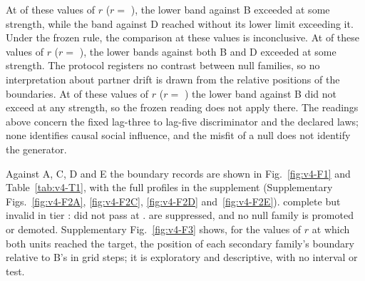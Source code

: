 At  of these values of $r$ ($r=$ ), the lower band against B exceeded  at some strength, while the band against D reached  without its lower limit exceeding it. Under the frozen rule, the comparison at these values is inconclusive. %
At  of these values of $r$ ($r=$ ), the lower bands against both B and D exceeded  at some strength. The protocol registers no contrast between null families, so no interpretation about partner drift is drawn from the relative positions of the boundaries. %
At  of these values of $r$ ($r=$ ) the lower band against B did not exceed  at any strength, so the frozen reading does not apply there. %
The readings above concern the fixed lag-three to lag-five discriminator and the declared laws; none identifies causal social influence, and the misfit of a null does not identify the generator. %

Against A, C, D and E the boundary records are shown in Fig.~\ref{fig:v4-F1} and Table~\ref{tab:v4-T1}, with the full profiles in the supplement (Supplementary Figs.~\ref{fig:v4-F2A}, \ref{fig:v4-F2C}, \ref{fig:v4-F2D} and~\ref{fig:v4-F2E}). %
  complete but invalid  in tier :  did not pass at .  are suppressed, and no null family is promoted or demoted. %
Supplementary Fig.~\ref{fig:v4-F3} shows, for the values of $r$ at which both units reached the target, the position of each secondary family's boundary relative to B's in grid steps; it is exploratory and descriptive, with no interval or test. %
